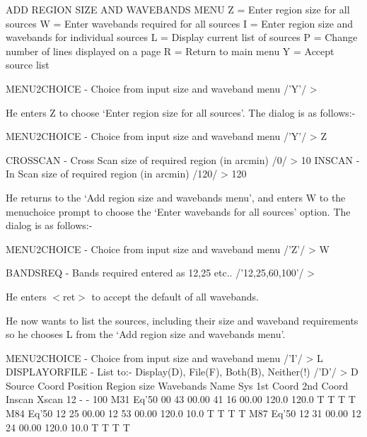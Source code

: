 \documentclass[twoside,11pt]{starlink}
\begin{document}
\begin{terminalv}
ADD REGION SIZE AND WAVEBANDS MENU
  Z = Enter region size for all sources
  W = Enter wavebands required for all sources
  I = Enter region size and wavebands for individual sources
  L = Display current list of sources
  P = Change number of lines displayed on a page
  R = Return to main menu
  Y = Accept source list

MENU2CHOICE - Choice from input size and waveband menu /'Y'/ >
\end{terminalv}

He enters Z to choose `Enter region size for all sources'. The dialog is as
follows:-

\begin{terminalv}
MENU2CHOICE - Choice from input size and waveband menu /'Y'/ > Z

CROSSCAN - Cross Scan size of required region (in arcmin) /0/ > 10
INSCAN - In Scan size of required region (in arcmin) /120/ > 120
\end{terminalv}

He returns to the `Add region size and wavebands menu', and enters W to the
menuchoice prompt to choose the `Enter wavebands for all sources' option. The
dialog is as follows:-

\begin{terminalv}
MENU2CHOICE - Choice from input size and waveband menu /'Z'/ > W

BANDSREQ - Bands required entered as 12,25 etc.. /'12,25,60,100'/ >
\end{terminalv}

He enters $<$ret$>$ to accept the default of all wavebands.

He now wants to list the sources, including their size and waveband requirements
so he chooses L from the `Add region size and wavebands menu'.

\begin{terminalv}
MENU2CHOICE - Choice from input size and waveband menu /'I'/ > L
DISPLAYORFILE - List to:- Display(D), File(F), Both(B), Neither(!) /'D'/ > D
 Source    Coord             Position               Region size     Wavebands
  Name      Sys      1st Coord       2nd Coord    Inscan  Xscan    12 - - 100
M31        Eq'50    00 43 00.00     41 16 00.00    120.0  120.0     T T T T
M84        Eq'50    12 25 00.00     12 53 00.00    120.0   10.0     T T T T
M87        Eq'50    12 31 00.00     12 24 00.00    120.0   10.0     T T T T
\end{terminalv}
\end{document}
